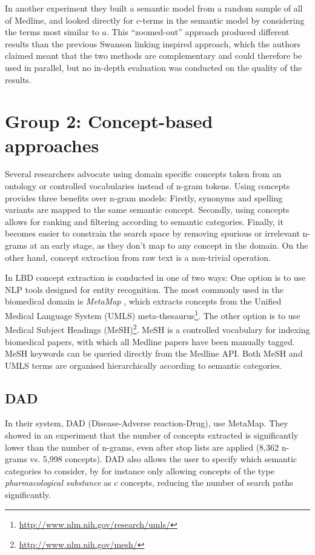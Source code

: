 In another experiment they built a semantic model from a random sample of all of Medline, and looked directly for $c$-terms in the semantic model by considering the terms most similar to $a$. 
This ``zoomed-out'' approach produced different results than the previous Swanson linking inspired approach, which the authors claimed meant that the two methods are complementary and could therefore be used in parallel, but no in-depth evaluation was conducted on the quality of the results. 

\section{Group 2: Concept-based approaches}

Several researchers advocate using domain specific concepts taken from an ontology or controlled vocabularies instead of n-gram tokens. Using concepts provides three benefits over n-gram models: Firstly, synonyms and spelling variants are mapped to the same semantic concept.  Secondly, using concepts allows for ranking and filtering according to semantic categories. Finally, it becomes easier to constrain the search space by removing spurious or irrelevant n-grams at an early stage, as they don't map to any concept in the domain. On the other hand, concept extraction from raw text is a non-trivial operation.

In LBD concept extraction is conducted in one of two ways: One option is to use NLP tools designed for entity recognition. The most commonly used in the biomedical domain is \emph{MetaMap} \cite{aro10}, which extracts concepts from the Unified Medical Language System (UMLS) meta-thesaurus\footnote{\url{http://www.nlm.nih.gov/research/umls/}}. The other option is to use Medical Subject Headings (MeSH)\footnote{\url{http://www.nlm.nih.gov/mesh/}}. MeSH is a controlled vocabulary for indexing biomedical papers, with which all Medline papers have been manually tagged. MeSH keywords can be queried directly from the Medline API. Both MeSH and UMLS terms are organised hierarchically according to semantic categories.

\subsection{DAD}

In their system, DAD (Disease-Adverse reaction-Drug), \citet{wee01} use MetaMap. They showed in an experiment that the number of concepts extracted is significantly lower than the number of n-grams, even after stop lists are applied (8,362 n-grams vs. 5,998 concepts). DAD also allows the user to specify which semantic categories to consider, by for instance only allowing concepts of the type \emph{pharmacological substance} as $c$ concepts, reducing the number of search paths significantly.

